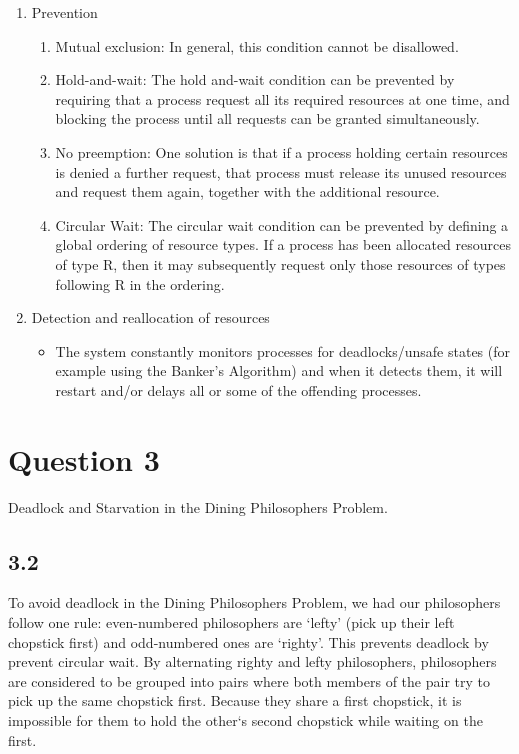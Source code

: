 \documentclass[11pt, letterpaper]{article}
\begin{document}
\begin{enumerate}
    \item Prevention
        \begin{enumerate}[label=\arabic*.]
            \item Mutual exclusion: In general, this condition cannot be disallowed.
            \item Hold-and-wait: The hold and-wait condition can be prevented by requiring that a process request all its required resources at one time, and blocking the process until all requests can be granted simultaneously.
            \item No preemption: One solution is that if a process holding certain resources is denied a further request, that process must release its unused resources and request them again, together with the additional resource.
            \item Circular Wait: The circular wait condition can be prevented by defining a global ordering of resource types. If a process has been allocated resources of type R, then it may subsequently request only those resources of types following R in the ordering.
        \end{enumerate}
    \item Detection and reallocation of resources
        \begin{itemize}
            \item The system constantly monitors processes for deadlocks/unsafe states (for example using the Banker’s Algorithm) and when it detects them, it will restart and/or delays all or some of the offending processes.
        \end{itemize}
\end{enumerate}
\pagebreak

\section*{Question 3}

Deadlock and Starvation in the Dining Philosophers Problem.

\subsection*{3.2}

To avoid deadlock in the Dining Philosophers Problem, we had our philosophers follow one rule: even-numbered philosophers are `lefty' (pick up their left chopstick first) and odd-numbered ones are `righty'. This prevents deadlock by prevent circular wait. By alternating righty and lefty philosophers, philosophers are considered to be grouped into pairs where both members of the pair try to pick up the same chopstick first. Because they share a first chopstick, it is impossible for them to hold the other`s second chopstick while waiting on the first.\\
\end{document}
